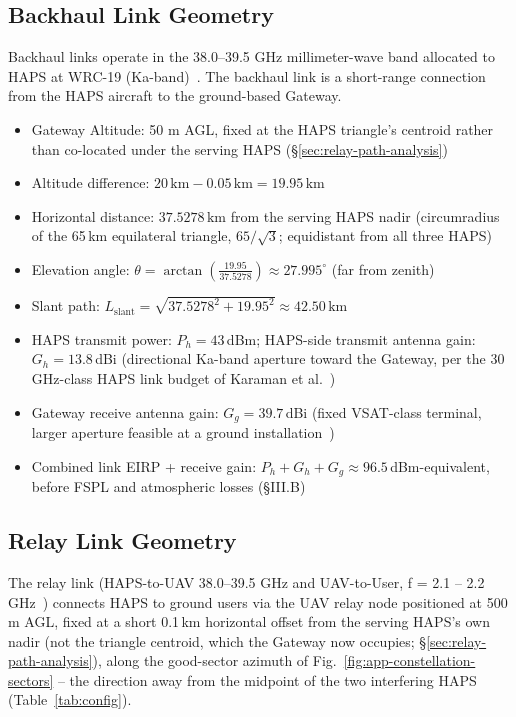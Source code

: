 \documentclass[conference]{IEEEtran}
\begin{document}
\subsection{Backhaul Link Geometry}
\label{subsec:backhaul-geometry}
Backhaul links operate in the 38.0–39.5 GHz millimeter-wave band allocated to HAPS at WRC-19 (Ka-band)~\cite{wrc19}.
The backhaul link is a short-range connection from the HAPS aircraft to the ground-based Gateway.
\begin{itemize}
  \item Gateway Altitude: 50 m AGL, fixed at the HAPS triangle's centroid rather than co-located under the serving HAPS (\S\ref{sec:relay-path-analysis})
  \item Altitude difference: $20\,\mathrm{km} - 0.05\,\mathrm{km} = 19.95\,\mathrm{km}$
  \item Horizontal distance: $37.5278\,\mathrm{km}$ from the serving HAPS nadir (circumradius of the 65\,km equilateral triangle, $65/\sqrt{3}$; equidistant from all three HAPS)
  \item Elevation angle: $\theta = \arctan\left(\frac{19.95}{37.5278}\right) \approx 27.995^\circ$ (far from zenith)
  \item Slant path: $L_{\text{slant}} = \sqrt{37.5278^2 + 19.95^2} \approx 42.50\,\mathrm{km}$
  \item HAPS transmit power: $P_h = 43$\,dBm; HAPS-side transmit antenna gain: $G_h = 13.8$\,dBi (directional Ka-band aperture toward the Gateway, per the 30\,GHz-class HAPS link budget of Karaman et al.~\cite{karaman2025haps})
  \item Gateway receive antenna gain: $G_g = 39.7$\,dBi (fixed VSAT-class terminal, larger aperture feasible at a ground installation~\cite{karaman2025haps})
  \item Combined link EIRP + receive gain: $P_h + G_h + G_g \approx 96.5$\,dBm-equivalent, before FSPL and atmospheric losses (\S III.B)
\end{itemize}

\subsection{Relay Link Geometry}

The relay link (HAPS-to-UAV 38.0–39.5 GHz and UAV-to-User, f = 2.1 -- 2.2 GHz~\cite{wrc19,3gpp_ts38101_5}) connects HAPS to ground users via the UAV relay node positioned at
500 m AGL, fixed at a short 0.1\,km horizontal offset from the serving HAPS's own nadir (not the triangle centroid, which the Gateway now occupies; \S\ref{sec:relay-path-analysis}), along the good-sector azimuth of Fig.~\ref{fig:app-constellation-sectors} -- the direction away from the midpoint of the two interfering HAPS (Table~\ref{tab:config}).
\end{document}
